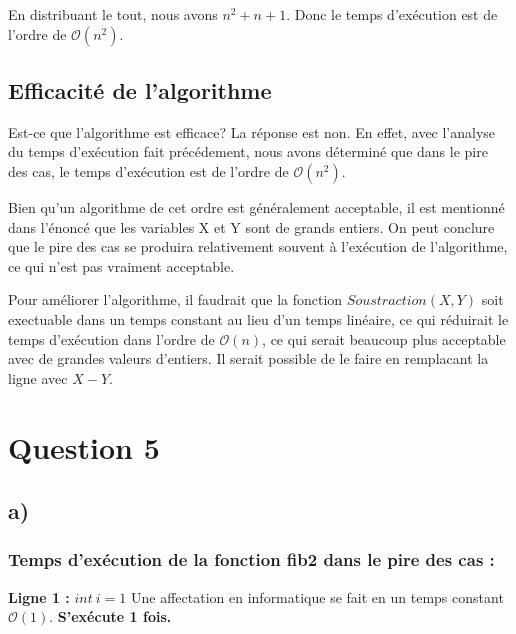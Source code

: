 \documentclass[12pt]{article}
\begin{document}
    \noindent En distribuant le tout, nous avons \( n ^ 2 + n + 1 \). Donc le
    temps d'exécution est de l'ordre de \( \mathcal{O}(n^2) \).

  \subsection*{Efficacité de l'algorithme}
   	Est-ce que l'algorithme est efficace? La réponse est non. En effet, avec
   	l'analyse du temps d'exécution fait précédement, nous avons déterminé
   	que dans le pire des cas, le temps d'exécution est de l'ordre
   	de \( \mathcal{O}(n^2) \). \newline

   	\noindent Bien qu'un algorithme de cet ordre est généralement acceptable,
   	il est mentionné dans l'énoncé que les variables X et Y sont de grands
   	entiers. On peut conclure que le pire des cas se produira relativement
   	souvent à l'exécution de l'algorithme, ce qui n'est pas vraiment
    acceptable. \newline

    \noindent Pour améliorer l'algorithme, il faudrait que la fonction
    \( Soustraction(X, Y) \) soit exectuable dans un temps constant au lieu d'un
    temps linéaire, ce qui réduirait le temps d'exécution dans l'ordre de
    \( \mathcal{O}(n) \), ce qui serait beaucoup plus acceptable avec de grandes
    valeurs d'entiers. Il serait possible de le faire en remplacant la ligne
    avec \( X - Y \).

  \newpage

  \section*{Question 5}
  	\subsection*{a)}

  	  \subsubsection*{Temps d'exécution de la fonction fib2 dans le pire des cas :}

  	    \noindent \textbf{Ligne 1 :} \( int \: i = 1 \) \newline
        Une affectation en informatique se fait en un temps constant
        \( \mathcal{O}(1) \). \newline
		\textbf{S'exécute 1 fois.} \newline
\end{document}

